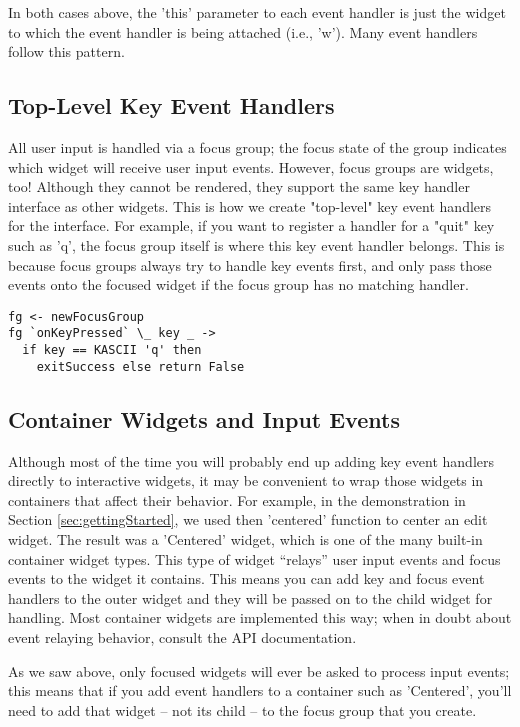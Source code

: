In both cases above, the 'this' parameter to each event handler is just
the widget to which the event handler is being attached (i.e., 'w').
Many event handlers follow this pattern.

\subsection{Top-Level Key Event Handlers}

All user input is handled via a focus group; the focus state of the
group indicates which widget will receive user input events.  However,
focus groups are widgets, too!  Although they cannot be rendered, they
support the same key handler interface as other widgets.  This is how
we create "top-level" key event handlers for the interface.  For
example, if you want to register a handler for a "quit" key such as
'q', the focus group itself is where this key event handler belongs.
This is because focus groups always try to handle key events first,
and only pass those events onto the focused widget if the focus group
has no matching handler.

\begin{verbatim}
fg <- newFocusGroup
fg `onKeyPressed` \_ key _ ->
  if key == KASCII 'q' then
    exitSuccess else return False
\end{verbatim}

\subsection{Container Widgets and Input Events}

Although most of the time you will probably end up adding key event
handlers directly to interactive widgets, it may be convenient to wrap
those widgets in containers that affect their behavior.  For example,
in the demonstration in Section \ref{sec:gettingStarted}, we used then
'centered' function to center an edit widget.  The result was a
'Centered' widget, which is one of the many built-in container widget
types.  This type of widget ``relays'' user input events and focus
events to the widget it contains.  This means you can add key and
focus event handlers to the outer widget and they will be passed on to
the child widget for handling.  Most container widgets are implemented
this way; when in doubt about event relaying behavior, consult the API
documentation.

As we saw above, only focused widgets will ever be asked to process
input events; this means that if you add event handlers to a container
such as 'Centered', you'll need to add that widget -- not its child --
to the focus group that you create.

